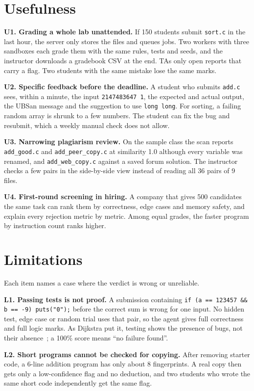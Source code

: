 \documentclass[conference]{IEEEtran}
\newcommand{\code}[1]{\texttt{#1}}
\begin{document}
\section{Usefulness}\label{sec:use}

\textbf{U1. Grading a whole lab unattended.} If 150 students submit \code{sort.c} in the last
hour, the server only stores the files and queues jobs. Two workers with three sandboxes each
grade them with the same rules, tests and seeds, and the instructor downloads a gradebook CSV
at the end. TAs only open reports that carry a flag. Two students with the same mistake lose
the same marks.

\textbf{U2. Specific feedback before the deadline.} A student who submits \code{add.c} sees,
within a minute, the input \code{2147483647 1}, the expected and actual output, the UBSan message
and the suggestion to use \code{long long}. For sorting, a failing random array is shrunk to a
few numbers. The student can fix the bug and resubmit, which a weekly manual check does not
allow.

\textbf{U3. Narrowing plagiarism review.} On the sample class the scan reports
\code{add\_good.c} and \code{add\_peer\_copy.c} at similarity 1.0 although every variable was
renamed, and \code{add\_web\_copy.c} against a saved forum solution. The instructor checks a few
pairs in the side-by-side view instead of reading all 36 pairs of 9 files.

\textbf{U4. First-round screening in hiring.} A company that gives 500 candidates the same
task can rank them by correctness, edge cases and memory safety, and explain every rejection
metric by metric. Among equal grades, the faster program by instruction count ranks higher.

\section{Limitations}\label{sec:lim}
Each item names a case where the verdict is wrong or unreliable.

\textbf{L1. Passing tests is not proof.} A submission containing
\code{if (a == 123457 \&\& b == -9) puts("0");} before the correct sum is wrong for one input.
No hidden test, edge case or random trial uses that pair, so the agent gives full correctness
and full logic marks. As Dijkstra put it, testing shows the presence of bugs, not their absence~\cite{dijkstra1972}; a 100\% score means ``no failure found''.

\textbf{L2. Short programs cannot be checked for copying.} After removing starter code, a
6-line addition program has only about 8 fingerprints. A real copy then gets only a
low-confidence flag and no deduction, and two students who wrote the same short code
independently get the same flag.
\end{document}

